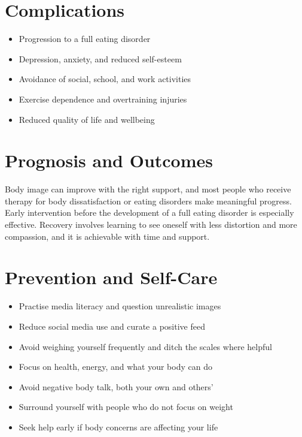 \section*{Complications}
\begin{itemize}
    \item Progression to a full eating disorder
    \item Depression, anxiety, and reduced self-esteem
    \item Avoidance of social, school, and work activities
    \item Exercise dependence and overtraining injuries
    \item Reduced quality of life and wellbeing
\end{itemize}

\section*{Prognosis and Outcomes}
Body image can improve with the right support, and most people who receive therapy for body dissatisfaction or eating disorders make meaningful progress. Early intervention before the development of a full eating disorder is especially effective. Recovery involves learning to see oneself with less distortion and more compassion, and it is achievable with time and support.

\section*{Prevention and Self-Care}
\begin{itemize}
    \item Practise media literacy and question unrealistic images
    \item Reduce social media use and curate a positive feed
    \item Avoid weighing yourself frequently and ditch the scales where helpful
    \item Focus on health, energy, and what your body can do
    \item Avoid negative body talk, both your own and others'
    \item Surround yourself with people who do not focus on weight
    \item Seek help early if body concerns are affecting your life
\end{itemize}

